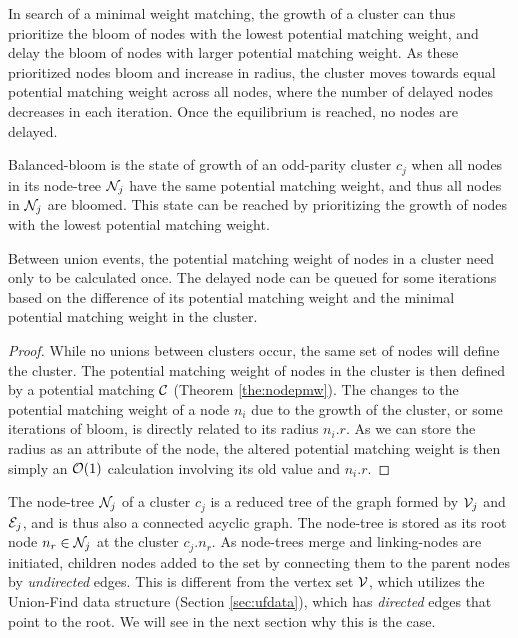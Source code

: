In search of a minimal weight matching, the growth of a cluster can thus prioritize the bloom of nodes with the lowest potential matching weight, and delay the bloom of nodes with larger potential matching weight. As these prioritized nodes bloom and increase in radius, the cluster moves towards equal potential matching weight across all nodes, where the number of delayed nodes decreases in each iteration. Once the equilibrium is reached, no nodes are delayed.
\begin{definition}\label{def:balancedbloom}
  Balanced-bloom is the state of growth of an odd-parity cluster $c_j$ when all nodes in its node-tree $\mathcal{N}_j$ have the same potential matching weight, and thus all nodes in $\mathcal{N}_j$ are bloomed. This state can be reached by prioritizing the growth of nodes with the lowest potential matching weight. 
\end{definition}
\begin{lemma}\label{lem:calconce}
  Between union events, the potential matching weight of nodes in a cluster need only to be calculated once. The delayed node can be queued for some iterations based on the difference of its potential matching weight and the minimal potential matching weight in the cluster.
\end{lemma}
\begin{proof}
  While no unions between clusters occur, the same set of nodes will define the cluster. The potential matching weight of nodes in the cluster is then defined by a potential matching $\mathcal{C}$ (Theorem \ref{the:nodepmw}). The changes to the potential matching weight of a node $n_i$ due to the growth of the cluster, or some iterations of bloom, is directly related to its radius $n_i.r$. As we can store the radius as an attribute of the node, the altered potential matching weight is then simply an $\mathcal{O}(1)$ calculation involving its old value and $n_i.r$. 
\end{proof}

The node-tree $\mathcal{N}_j$ of a cluster $c_j$ is a reduced tree of the graph formed by $\mathcal{V}_j$ and $\mathcal{E}_j$, and is thus also a connected acyclic graph. The node-tree is stored as its root node $n_r \in \mathcal{N}_j$ at the cluster $c_j.n_r$. As node-trees merge and linking-nodes are initiated, children nodes added to the set by connecting them to the parent nodes by \emph{undirected} edges. This is different from the vertex set $\mathcal{V}$, which utilizes the Union-Find data structure (Section \ref{sec:ufdata}), which has \emph{directed} edges that point to the root. We will see in the next section why this is the case. 

